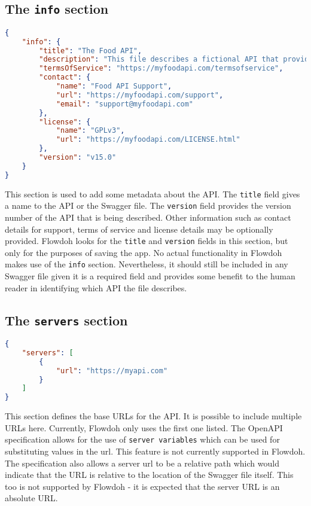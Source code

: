 \subsection{The \texttt{info} section}
\begin{lstlisting}[caption={A fully populated \texttt{info} section},label={code:info_section},language=json]
{
    "info": {
        "title": "The Food API",
        "description": "This file describes a fictional API that provides details about food items",
        "termsOfService": "https://myfoodapi.com/termsofservice",
        "contact": {
            "name": "Food API Support",
            "url": "https://myfoodapi.com/support",
            "email": "support@myfoodapi.com"
        },
        "license": {
            "name": "GPLv3",
            "url": "https://myfoodapi.com/LICENSE.html"
        },
        "version": "v15.0"
    }
}
\end{lstlisting}
This section is used to add some metadata about the API. The \texttt{title} field gives a name to the API or the Swagger file. The \texttt{version} field provides the version number of the API that is being described. Other information such as contact details for support, terms of service and license details may be optionally provided. Flowdoh looks for the \texttt{title} and \texttt{version} fields in this section, but only for the purposes of saving the app. No actual functionality in Flowdoh makes use of the \texttt{info} section. Nevertheless, it should still be included in any Swagger file given it is a required field and provides some benefit to the human reader in identifying which API the file describes.
\subsection{The \texttt{servers} section}

\begin{lstlisting}[caption={A URL defined in the \texttt{servers} section},label={code:servers},language=json]
{
    "servers": [
        {
            "url": "https://myapi.com"
        }
    ]
}
\end{lstlisting}
This section defines the base URLs for the API. It is possible to include multiple URLs here. Currently, Flowdoh only uses the first one listed. The OpenAPI specification allows for the use of \texttt{server variables} which can be used for substituting values in the url. This feature is not currently supported in Flowdoh. The specification also allows a server url to be a relative path which would indicate that the URL is relative to the location of the Swagger file itself. This too is not supported by Flowdoh - it is expected that the server URL is an absolute URL.
